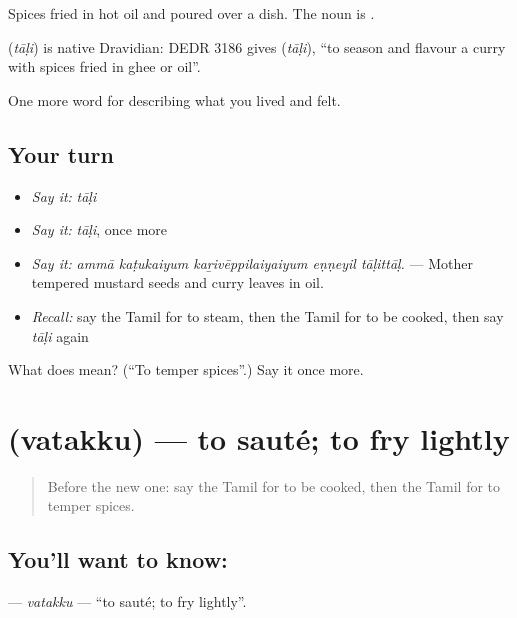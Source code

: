 Spices fried in hot oil and poured over a dish. The noun is .

\begin{cousinweb}
\textbf{} (\emph{tāḷi}) is native Dravidian: DEDR 3186 gives  (\emph{tāḷi}), \textquotedblleft{}to season and flavour a curry with spices fried in ghee or oil\textquotedblright{}.
\end{cousinweb}

\begin{grammarlens}[title={What you've built}]
One more word for describing what you lived and felt.
\end{grammarlens}

\subsection*{Your turn}
\begin{itemize}
\raggedright
  \item \emph{Say it:} \emph{tāḷi}
  \item \emph{Say it:} \emph{tāḷi}, once more
  \item \emph{Say it:} \emph{ammā kaṭukaiyum kaṟivēppilaiyaiyum eṇṇeyil tāḷittāḷ.} — Mother tempered mustard seeds and curry leaves in oil.
  \item \emph{Recall:} say the Tamil for to steam, then the Tamil for to be cooked, then say \emph{tāḷi} again
\end{itemize}

\begin{tcolorbox}[breakable,colback=teal!4,colframe=teal!35!black,title={Before you move on}]
What does  mean? (\textquotedblleft{}To temper spices\textquotedblright{}.) Say it once more.
\end{tcolorbox}
\section[\texorpdfstring{\ta{வதக்கு} (vatakku)}{வதக்கு (vatakku)}]{ (vatakku) — to sauté; to fry lightly}

\label{lesson:TA-C526-vatakku-saute}



\begin{quote}
Before the new one: say the Tamil for to be cooked, then the Tamil for to temper spices.
\end{quote}

\subsection*{You'll want to know: }
\textbf{} — \emph{vatakku} — \textquotedblleft{}to sauté; to fry lightly\textquotedblright{}.

